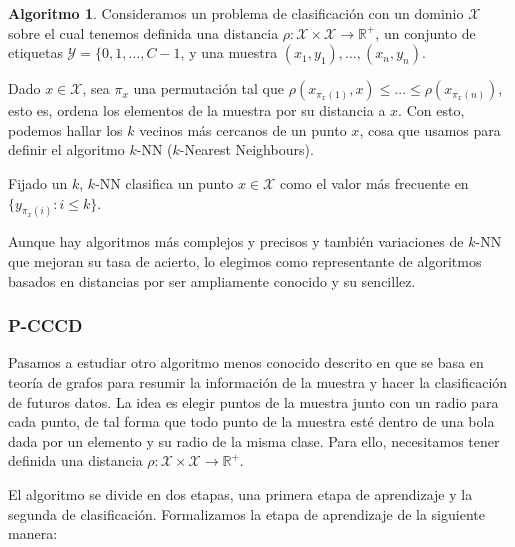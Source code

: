 \documentclass[a4paper,12pt]{report}
\theoremstyle{definition}
\newtheorem{alg}{Algoritmo}
\begin{document}
\begin{alg}
  Consideramos un problema de clasificación con un dominio $\mathcal{X}$ sobre el cual tenemos definida una distancia $\rho : \mathcal{X} \times \mathcal{X} \rightarrow \mathbb{R}^+$, un conjunto de etiquetas $\mathcal{Y} = \lbrace 0, 1, \ldots, C-1$, y una muestra $(x_1, y_1), \ldots, (x_n, y_n)$.

  Dado $x \in \mathcal{X}$, sea $\pi_x$ una permutación tal que $\rho(x_{\pi_x(1)}, x) \leq \ldots \leq \rho(x_{\pi_x(n)})$, esto es, ordena los elementos de la muestra por su distancia a $x$. Con esto, podemos hallar los $k$ vecinos más cercanos de un punto $x$, cosa que usamos para definir el algoritmo $k$-NN ($k$-Nearest Neighbours).

  Fijado un $k$, $k$-NN clasifica un punto $x \in \mathcal{X}$ como el valor más frecuente en $\lbrace y_{\pi_x(i)} : i \leq k \rbrace$.
\end{alg}

Aunque hay algoritmos más complejos y precisos y también variaciones de $k$-NN que mejoran su tasa de acierto, lo elegimos como representante de algoritmos basados en distancias por ser ampliamente conocido y su sencillez.

\subsubsection{P-CCCD}
Pasamos a estudiar otro algoritmo menos conocido descrito en \cite{manukyan2016classification} que se basa en teoría de grafos para resumir la información de la muestra y hacer la clasificación de futuros datos. La idea es elegir puntos de la muestra junto con un radio para cada punto, de tal forma que todo punto de la muestra esté dentro de una bola dada por un elemento y su radio de la misma clase. Para ello, necesitamos tener definida una distancia $\rho: \mathcal{X} \times \mathcal{X} \rightarrow \mathbb{R}^+$.

El algoritmo se divide en dos etapas, una primera etapa de aprendizaje y la segunda de clasificación. Formalizamos la etapa de aprendizaje de la siguiente manera:
\end{document}
